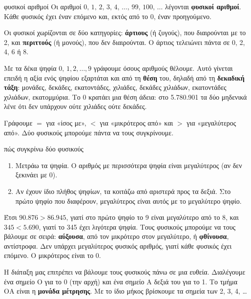 
\begin{orismos}{φυσικοί αριθμοί}
Οι αριθμοί $0,\,1,\,2,\,3,\,4,\,\dots,\,99,\,100,\,\dots$ λέγονται \textbf{φυσικοί αριθμοί}. Κάθε φυσικός έχει έναν επόμενο και, εκτός από το 0, έναν προηγούμενο.
\end{orismos}

Οι φυσικοί χωρίζονται σε δύο κατηγορίες: \textbf{άρτιους} (ή ζυγούς), που διαιρούνται με το 2, και \textbf{περιττούς} (ή μονούς), που δεν διαιρούνται. Ο άρτιος τελειώνει πάντα σε 0, 2, 4, 6 ή 8.


Με τα δέκα ψηφία $0,\,1,2,\dots,9$ γράφουμε όσους αριθμούς θέλουμε. Αυτό γίνεται επειδή η αξία ενός ψηφίου εξαρτάται και από τη \textbf{θέση} του, δηλαδή από τη \textbf{δεκαδική τάξη}: μονάδες, δεκάδες, εκατοντάδες, χιλιάδες, δεκάδες χιλιάδων, εκατοντάδες χιλιάδων, εκατομμύρια. Το 0 κρατάει μια θέση άδεια: στο 5.780.901 τα δύο μηδενικά λένε ότι δεν υπάρχουν ούτε χιλιάδες ούτε δεκάδες.


Γράφουμε $=$ για «ίσος με», $<$ για «μικρότερος από» και $>$ για «μεγαλύτερος από». Δύο φυσικούς μπορούμε πάντα να τους συγκρίνουμε.

\begin{kanonas}{πώς συγκρίνω δύο φυσικούς}
\begin{enumerate}[leftmargin=1.6em,itemsep=0.2ex,topsep=2pt]
\item Μετράω τα ψηφία. Ο αριθμός με περισσότερα ψηφία είναι μεγαλύτερος (αν δεν ξεκινάει με 0).
\item Αν έχουν ίδιο πλήθος ψηφίων, τα κοιτάζω από αριστερά προς τα δεξιά. Στο πρώτο ψηφίο που διαφέρουν, μεγαλύτερος είναι αυτός με το μεγαλύτερο ψηφίο.
\end{enumerate}
\end{kanonas}

Έτσι $90.876>86.945$, γιατί στο πρώτο ψηφίο το 9 είναι μεγαλύτερο από το 8, και $345<5.690$, γιατί το 345 έχει λιγότερα ψηφία. Τους φυσικούς μπορούμε να τους βάλουμε σε σειρά: \textbf{αύξουσα}, από τον μικρότερο στον μεγαλύτερο, ή \textbf{φθίνουσα}, αντίστροφα. Δεν υπάρχει μεγαλύτερος φυσικός αριθμός, γιατί κάθε φυσικός έχει επόμενο. Ο μικρότερος είναι το 0.


Η διάταξη μας επιτρέπει να βάλουμε τους φυσικούς πάνω σε μια ευθεία. Διαλέγουμε ένα σημείο Ο για το 0 (την αρχή) και ένα σημείο Α δεξιά του για το 1. Το τμήμα ΟΑ είναι η \textbf{μονάδα μέτρησης}. Με το ίδιο μήκος βρίσκουμε τα σημεία των 2, 3, 4, \dots


